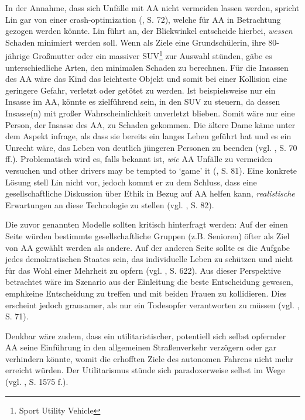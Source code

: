 \documentclass[a4paper, 12pt, titlepage]{scrartcl}
\begin{document}
	In der Annahme, dass sich Unf\"alle mit AA nicht vermeiden lassen werden, spricht Lin \autocite{Lin2015} gar von einer \glqq crash-optimization\grqq{} (\autocite{Lin2015}, S. 72), welche f\"ur AA in Betrachtung gezogen werden k\"onnte. Lin \autocite{Lin2015} f\"uhrt an, der Blickwinkel entscheide hierbei, \emph{wessen} Schaden minimiert werden soll. Wenn als \glqq Ziele\grqq{} eine Grundsch\"ulerin, ihre 80-j\"ahrige Gro\ss mutter oder ein massiver SUV\footnote{Sport Utility Vehicle} zur Auswahl st\"unden, g\"abe es unterschiedliche Arten, den minimalen Schaden zu berechnen. F\"ur die Insassen des AA w\"are das Kind das leichteste Objekt und somit bei einer Kollision eine geringere Gefahr, verletzt oder get\"otet zu werden. Ist beispielsweise nur ein Insasse im AA, k\"onnte es zielf\"uhrend sein, in den SUV zu steuern, da dessen Insasse(n) mit gro\ss er Wahrscheinlichkeit unverletzt blieben. Somit w\"are nur eine Person, der Insasse des AA, zu Schaden gekommen. Die \"altere Dame k\"ame unter dem Aspekt infrage, als dass sie bereits ein langes Leben gef\"uhrt hat und es ein Unrecht w\"are, das Leben von deutlich j\"ungeren Personen zu beenden (vgl. \autocite{Lin2015}, S. 70 ff.). Problematisch wird es, falls bekannt ist, \emph{wie} AA Unf\"alle zu vermeiden versuchen und \glqq other drivers may be tempted to `game' it\grqq{} (\autocite{Lin2015}, S. 81). Eine konkrete L\"osung stell Lin \autocite{Lin2015} nicht vor, jedoch kommt er zu dem Schluss, dass eine gesellschaftliche Diskussion \"uber Ethik in Bezug auf AA helfen kann, \emph{realistische} Erwartungen an diese Technologie zu stellen (vgl. \autocite{Lin2015}, S. 82).
	
	Die zuvor genannten Modelle sollten kritisch hinterfragt werden: Auf der einen Seite w\"urden bestimmte gesellschaftliche Gruppen (z.B. Senioren) \"ofter als \glqq Ziel\grqq{} von AA gew\"ahlt werden als andere. Auf der anderen Seite sollte es die Aufgabe jedes demokratischen Staates sein, das individuelle Leben zu sch\"utzen und nicht f\"ur das Wohl einer Mehrheit zu opfern (vgl. \autocite{Hevelke2015}, S. 622). Aus dieser Perspektive betrachtet w\"are im Szenario aus der Einleitung die beste Entscheidung gewesen, emph{keine} Entscheidung zu treffen und mit beiden Frauen zu kollidieren. Dies erscheint jedoch grausamer, als nur ein Todesopfer verantworten zu m\"ussen (vgl. \autocite{Lin2015}, S. 71).
	
	Denkbar w\"are zudem, dass ein utilitaristischer, potentiell sich selbst opfernder AA seine Einf\"uhrung in den allgemeinen Stra\ss enverkehr verz\"ogern oder gar verhindern k\"onnte, womit die erhofften Ziele des autonomen Fahrens nicht mehr erreicht w\"urden. Der Utilitarismus st\"unde sich paradoxerweise selbst im Wege (vgl. \autocite{Bonnefon1573}, S. 1575 f.).
\end{document}
